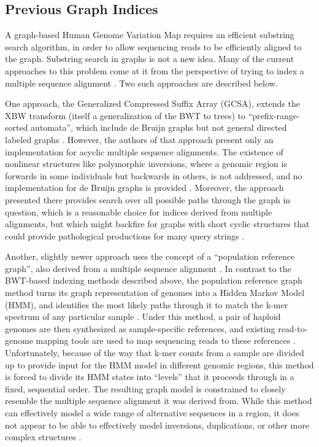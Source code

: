
\subsection{Previous Graph Indices}

A graph-based Human Genome Variation Map requires an efficient substring search algorithm, in order to allow sequencing reads to be efficiently aligned to the graph. Substring search in graphs is not a new idea. Many of the current approaches to this problem come at it from the perspective of trying to index a multiple sequence alignment \cite{siren2014indexing}. Two such approaches are described below.

One approach, the Generalized Compressed Suffix Array (GCSA), extends the XBW transform (itself a generalization of the BWT to trees) to ``prefix-range-sorted automata'', which include de Bruijn graphs but not general directed labeled graphs \cite{siren2014indexing}. However, the authors of that approach present only an implementation for acyclic multiple sequence alignments. The existence of nonlinear structures like polymorphic inversions, where a genomic region is forwards in some individuals but backwards in others, is not addressed, and no implementation for de Bruijn graphs is provided \cite{siren2014indexing}. Moreover, the approach presented there provides search over all possible paths through the graph in question, which is a reasonable choice for indices derived from multiple alignments, but which might backfire for graphs with short cyclic structures that could provide pathological productions for many query strings \cite{siren2014indexing}.

Another, slightly newer approach uses the concept of a ``population reference graph'', also derived from a multiple sequence alignment \cite{dilthey2015improved}. In contrast to the BWT-based indexing methods described above, the population reference graph method turns its graph representation of genomes into a Hidden Markov Model (HMM), and identifies the most likely paths through it to match the k-mer spectrum of any particular sample \cite{dilthey2015improved}. Under this method, a pair of haploid genomes are then synthesized as sample-specific references, and existing read-to-genome mapping tools are used to map sequencing reads to these references \cite{dilthey2015improved}. Unfortunately, because of the way that k-mer counts from a sample are divided up to provide input for the HMM model in different genomic regions, this method is forced to divide its HMM states into ``levels'' that it proceeds through in a fixed, sequential order. The resulting graph model is constrained to closely resemble the multiple sequence alignment it was derived from. While this method can effectively model a wide range of alternative sequences in a region, it does not appear to be able to effectively model inversions, duplications, or other more complex structures \cite{dilthey2015improved}.

